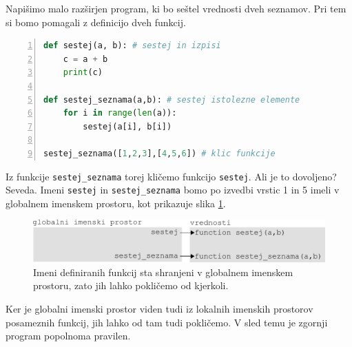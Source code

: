 Napišimo malo razširjen program, ki bo seštel vrednosti dveh seznamov. Pri tem si bomo pomagali z definicijo dveh funkcij.
\begin{lstlisting}[language=Python,numbers=left]
def sestej(a, b): # sestej in izpisi
    c = a + b
    print(c)

def sestej_seznama(a,b): # sestej istolezne elemente
    for i in range(len(a)):
        sestej(a[i], b[i])

sestej_seznama([1,2,3],[4,5,6]) # klic funkcije
\end{lstlisting}
Iz funkcije \texttt{sestej\_seznama} torej kličemo funkcijo \texttt{sestej}. Ali je to dovoljeno? Seveda. Imeni \texttt{sestej} in \texttt{sestej\_seznama} bomo po izvedbi vrstic 1 in 5 imeli v globalnem imenskem prostoru, kot prikazuje slika  \ref{img:imenski_prostor_7}.
\begin{figure}
    \centering
    \includegraphics[width=\linewidth]{img/imenski_prostor_7.pdf}
    \caption{Imeni definiranih funkcij sta shranjeni v globalnem imenskem prostoru, zato jih lahko pokličemo od kjerkoli.}
    \label{img:imenski_prostor_7}
\end{figure}

Ker je globalni imenski prostor viden tudi iz lokalnih imenskih prostorov posameznih funkcij, jih lahko od tam tudi pokličemo. V sled temu je zgornji program popolnoma pravilen. 

